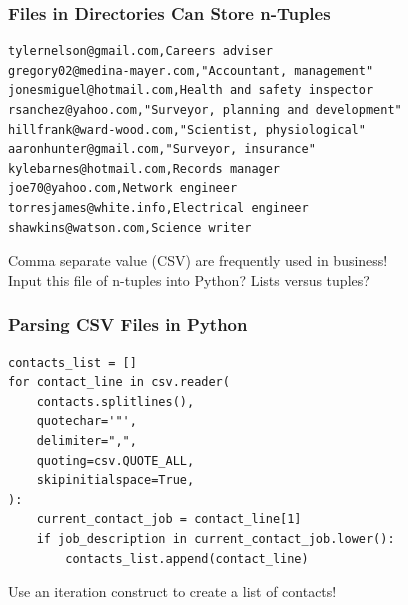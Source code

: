 \documentclass[14pt,aspectratio=169]{beamer}
\begin{document}
%
\begin{frame}[fragile]
  \frametitle{Files in Directories Can Store n-Tuples}
  \begin{minipage}{6in}
    \vspace*{.15in}
    \begin{verbatim}
tylernelson@gmail.com,Careers adviser
gregory02@medina-mayer.com,"Accountant, management"
jonesmiguel@hotmail.com,Health and safety inspector
rsanchez@yahoo.com,"Surveyor, planning and development"
hillfrank@ward-wood.com,"Scientist, physiological"
aaronhunter@gmail.com,"Surveyor, insurance"
kylebarnes@hotmail.com,Records manager
joe70@yahoo.com,Network engineer
torresjames@white.info,Electrical engineer
shawkins@watson.com,Science writer
    \end{verbatim}
  \end{minipage}
  \vspace*{.05in}
  \begin{center}
    \normalsize \noindent Comma separate value (CSV) are frequently used in
    business! \\
    \normalsize \noindent Input this file of n-tuples into Python? Lists versus
    tuples? \\
  \end{center}
\end{frame}

%
\begin{frame}[fragile]
  \frametitle{Parsing CSV Files in Python}
  \normalsize
  \begin{minipage}{6in}
    \vspace*{.25in}
    \begin{verbatim}
contacts_list = []
for contact_line in csv.reader(
    contacts.splitlines(),
    quotechar='"',
    delimiter=",",
    quoting=csv.QUOTE_ALL,
    skipinitialspace=True,
):
    current_contact_job = contact_line[1]
    if job_description in current_contact_job.lower():
        contacts_list.append(contact_line)
    \end{verbatim}
  \end{minipage}
  \vspace*{.1in}
  \begin{center}
    \normalsize \noindent Use an iteration construct to create a list of
    contacts! \\
  \end{center}
\end{frame}
\end{document}
